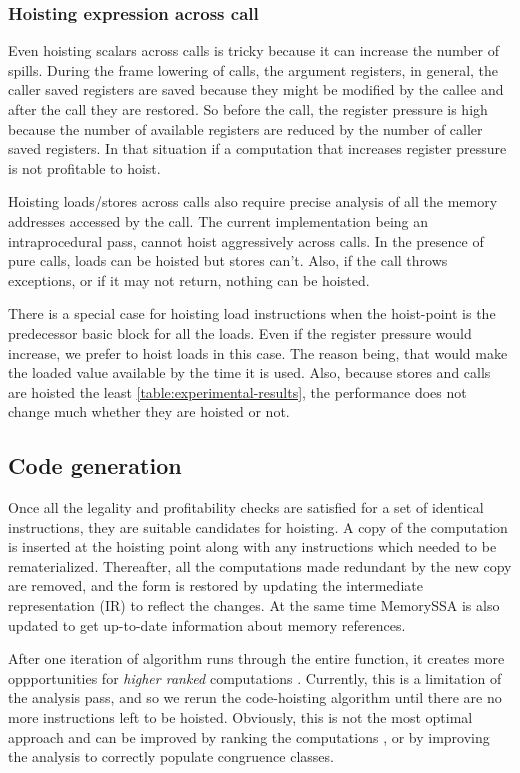 \documentclass[acmlarge,review]{acmart}\settopmatter{printfolios=true}
\begin{document}
\subsubsection{Hoisting expression across call}
\label{cost:across-calls}
Even hoisting scalars across calls is tricky because it can increase the number
of spills. During the frame lowering of calls, the argument registers, in
general, the caller saved registers are saved because they might be modified by
the callee and after the call they are restored. So before the call, the
register pressure is high because the number of available registers are reduced
by the number of caller saved registers. In that situation if a computation
that increases register pressure is not profitable to hoist.

Hoisting loads/stores across calls also require precise analysis of all the
memory addresses accessed by the call. The current implementation being an
intraprocedural pass, cannot hoist aggressively across calls. In the presence of
pure calls, loads can be hoisted but stores can't. Also, if the call throws
exceptions, or if it may not return, nothing can be hoisted.

There is a special case for hoisting load instructions when the hoist-point is
the predecessor basic block for all the loads. Even if the register pressure
would increase, we prefer to hoist loads in this case. The reason being, that
would make the loaded value available by the time it is used. Also, because
stores and calls are hoisted the least \ref{table:experimental-results}, the
performance does not change much whether they are hoisted or not.

\subsection{Code generation}
Once all the legality and profitability checks are satisfied for a set of
identical instructions, they are suitable candidates for hoisting. A copy of the
computation is inserted at the hoisting point along with any instructions which
needed to be rematerialized. Thereafter, all the computations made redundant by
the new copy are removed, and the \SSA{} form is restored by updating the
intermediate representation (IR) to reflect the changes. At the same time
MemorySSA is also updated to get up-to-date information about memory references.

After one iteration of algorithm runs through the entire function, it creates
more oppportunities for \emph{higher ranked} computations
\cite{rosen1988global}. Currently, this is a limitation of the \GVN{} analysis
pass, and so we rerun the code-hoisting algorithm until there are no more
instructions left to be hoisted.  Obviously, this is not the most optimal
approach and can be improved by ranking the computations \cite{rosen1988global},
or by improving the \GVN{} analysis to correctly populate congruence classes.
\end{document}
